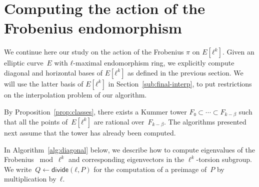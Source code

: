 \documentclass{lms}
\def\sfdiv{\mathsf{divide}}
\begin{document}
\section{Computing the action of the Frobenius endomorphism}
\label{sec:acti-frob-endm}


We continue here our study on the action of the Frobenius $π$ on
$E[ℓ^k]$.  Given an elliptic curve~$E$ with $ℓ$-maximal endomorphism
ring, we explicitly compute diagonal and horizontal bases of $E[ℓ^k]$
as defined in the previous section.  We will use the latter basis of
$E[ℓ^k]$ in Section~\ref{sub:final-interp}, to put restrictions on the
interpolation problem of our algorithm.

By Proposition~\ref{prop:classes}, there exists a Kummer tower
$F₀⊂\cdots⊂F_{k-\beta}$ such that all the points of~$E[ℓ^k]$ are
rational over~$F_{k-\beta}$. The algorithms presented next assume that
the tower has already been computed.


In Algorithm~\ref{alg:diagonal} below, we describe how to compute
eigenvalues of the Frobenius $\bmod \ell^k$ and corresponding
eigenvectors in the $\ell^{k}$-torsion subgroup.  We
write~$Q ← \sfdiv(ℓ, P)$ for the computation of a preimage of~$P$ by
multiplication by~$ℓ$.
\end{document}
